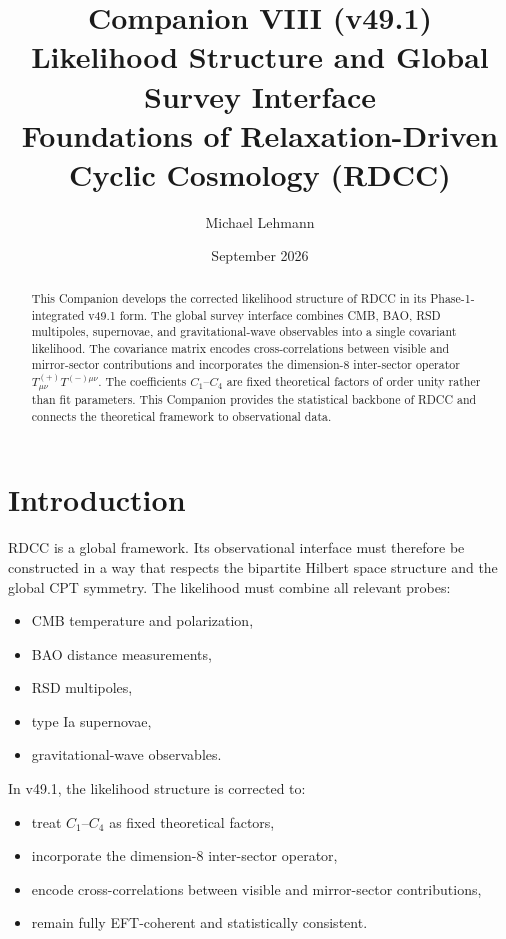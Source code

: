 \documentclass[11pt,a4paper]{article}
\title{\textbf{Companion VIII (v49.1)}\\[0.2cm]
\textbf{Likelihood Structure and Global Survey Interface}\\[0.2cm]
\large Foundations of Relaxation-Driven Cyclic Cosmology (RDCC)}
\author[1]{Michael Lehmann}
\affil[1]{\small Independent Researcher, Relaxation-Driven Cyclic Cosmology (RDCC)\\
\texttt{mi.lehmann@gmx.de}}
\date{September 2026}
\begin{document}
\maketitle


\begin{abstract}
This Companion develops the corrected likelihood structure of RDCC in its
Phase-1-integrated v49.1 form. The global survey interface combines CMB, BAO,
RSD multipoles, supernovae, and gravitational-wave observables into a single
covariant likelihood. The covariance matrix encodes cross-correlations between
visible and mirror-sector contributions and incorporates the dimension-8
inter-sector operator $T^{(+)}_{\mu\nu}T^{(-)\mu\nu}$. The coefficients
$C_1$–$C_4$ are fixed theoretical factors of order unity rather than fit
parameters. This Companion provides the statistical backbone of RDCC and
connects the theoretical framework to observational data.
\end{abstract}

\tableofcontents
\newpage

\section{Introduction}

RDCC is a global framework. Its observational interface must therefore be
constructed in a way that respects the bipartite Hilbert space structure and
the global CPT symmetry. The likelihood must combine all relevant probes:
\begin{itemize}[leftmargin=0.8cm]
  \item CMB temperature and polarization,
  \item BAO distance measurements,
  \item RSD multipoles,
  \item type Ia supernovae,
  \item gravitational-wave observables.
\end{itemize}

In v49.1, the likelihood structure is corrected to:
\begin{itemize}[leftmargin=0.8cm]
  \item treat $C_1$–$C_4$ as fixed theoretical factors,
  \item incorporate the dimension-8 inter-sector operator,
  \item encode cross-correlations between visible and mirror-sector
        contributions,
  \item remain fully EFT-coherent and statistically consistent.
\end{itemize}
\end{document}

